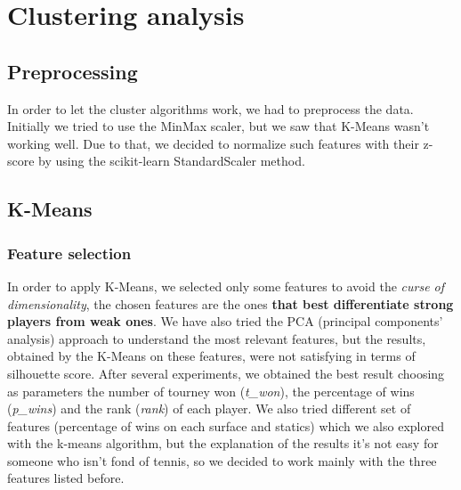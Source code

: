 \section{Clustering analysis}
\subsection{Preprocessing}
In order to let the cluster algorithms work, we had to preprocess the data. Initially we tried to use the MinMax scaler, but we saw that K-Means wasn't working well. Due to that, we decided to normalize such features with their z-score by using the scikit-learn StandardScaler method.

\subsection{K-Means}
\subsubsection{Feature selection} In order to apply K-Means, we selected only some features to avoid the \textit{curse of dimensionality}, the chosen features are the ones \textbf{that best differentiate strong players from weak ones}. We have also tried the PCA (principal components' analysis) approach to understand the most relevant features, but the results, obtained by the K-Means on these features, were not satisfying in terms of silhouette score. After several experiments, we obtained the best result choosing as parameters the number of tourney won (\textit{t\_won}), the percentage of wins (\textit{p\_wins}) and the rank (\textit{rank}) of each player.
We also tried different set of features (percentage of wins on each surface and statics) which we also explored with the k-means algorithm, but the explanation of the results it's not easy for someone who isn't fond of tennis, so we decided to work mainly with the three features listed before.

